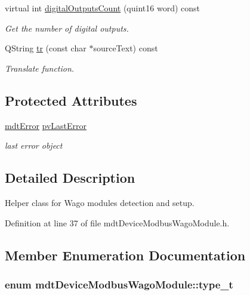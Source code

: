 \begin{DoxyCompactItemize}
virtual int \hyperlink{classmdt_device_modbus_wago_module_ac425538b1ae0be825929d58a9713c788}{digital\-Outputs\-Count} (quint16 word) const 
\begin{DoxyCompactList}\small\item\em Get the number of digital outputs. \end{DoxyCompactList}\item 
Q\-String \hyperlink{classmdt_device_modbus_wago_module_a8083087dff0226e6e0f7957f29ab14aa}{tr} (const char $\ast$source\-Text) const 
\begin{DoxyCompactList}\small\item\em Translate function. \end{DoxyCompactList}\end{DoxyCompactItemize}
\subsection*{Protected Attributes}
\begin{DoxyCompactItemize}
\item 
\hyperlink{classmdt_error}{mdt\-Error} \hyperlink{classmdt_device_modbus_wago_module_a1b104f3bb99f1990e59e0fafef01951f}{pv\-Last\-Error}
\begin{DoxyCompactList}\small\item\em last error object \end{DoxyCompactList}\end{DoxyCompactItemize}


\subsection{Detailed Description}
Helper class for Wago modules detection and setup. 

Definition at line 37 of file mdt\-Device\-Modbus\-Wago\-Module.\-h.



\subsection{Member Enumeration Documentation}
\hypertarget{classmdt_device_modbus_wago_module_a2d8f6895b2a031c953bd91c2f65a1a25}{
\subsubsection[{type\-\_\-t}]{\setlength{\rightskip}{0pt plus 5cm}enum {\bf mdt\-Device\-Modbus\-Wago\-Module\-::type\-\_\-t}}}\label{classmdt_device_modbus_wago_module_a2d8f6895b2a031c953bd91c2f65a1a25}


